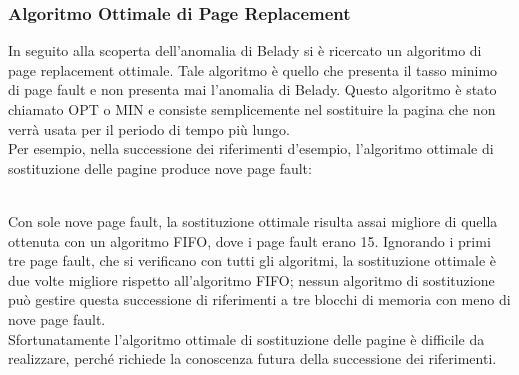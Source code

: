 \documentclass{article}
\begin{document}
			\subsubsection{Algoritmo Ottimale di Page Replacement}
				In seguito alla scoperta dell’anomalia di Belady si è ricercato un algoritmo di page replacement ottimale. Tale algoritmo è quello che presenta il tasso minimo di page fault e non presenta mai l’anomalia di Belady. Questo algoritmo è stato chiamato OPT o MIN e consiste semplicemente nel sostituire la pagina che non verrà usata per il periodo di tempo più lungo.
				\\Per esempio, nella successione dei riferimenti d’esempio, l’algoritmo ottimale di sostituzione delle pagine produce nove page fault:
				\begin{figure}[ht!]
				\end{figure}
				\\Con sole nove page fault, la sostituzione ottimale risulta assai migliore di quella ottenuta con un algoritmo FIFO, dove i page fault erano 15. Ignorando i primi tre page fault, che si verificano con tutti gli algoritmi, la sostituzione ottimale è due volte migliore rispetto all’algoritmo FIFO; nessun algoritmo di sostituzione può gestire questa successione di riferimenti a tre blocchi di memoria con meno di nove page fault.
				\\Sfortunatamente l’algoritmo ottimale di sostituzione delle pagine è difficile da realizzare, perché richiede la conoscenza futura della successione dei riferimenti.
\end{document}
